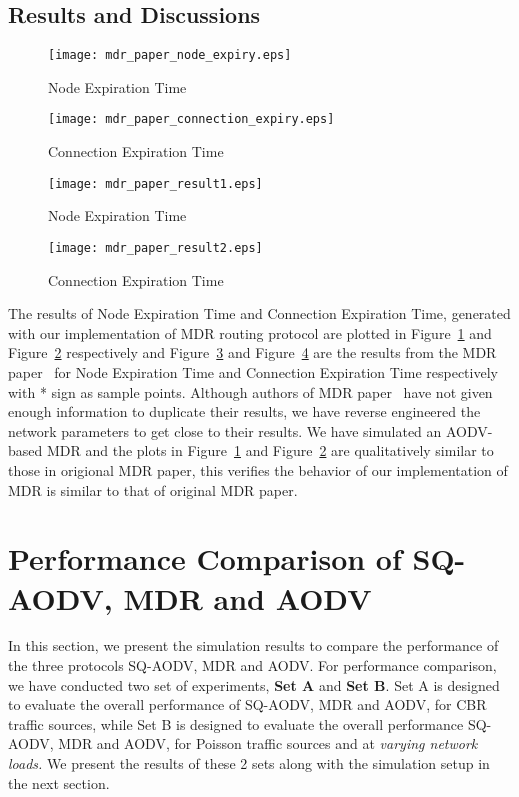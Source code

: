 \subsection{Results and Discussions}
\label{results-mdr}
\begin{figure}[htbp]
	\centering
	\texttt{[image: mdr\_paper\_node\_expiry.eps]}
	\caption{Node Expiration Time}
	\label{fig58}
\end{figure}

\begin{figure}[htbp]
	\centering
	\texttt{[image: mdr\_paper\_connection\_expiry.eps]}
	\caption{Connection Expiration Time}
	\label{fig59}
\end{figure}

\begin{figure}[htbp]
	\centering
	\texttt{[image: mdr\_paper\_result1.eps]}
	\caption{Node Expiration Time~\cite{mdr}}
	\label{fig510}
\end{figure}

\begin{figure}[htbp]
	\centering
	\texttt{[image: mdr\_paper\_result2.eps]}
	\caption{Connection Expiration Time~\cite{mdr}}
	\label{fig511}
\end{figure}

The results of Node Expiration Time and Connection Expiration Time, generated with our implementation of MDR routing protocol are plotted in Figure~\ref{fig58} and Figure~\ref{fig59} respectively and Figure~\ref{fig510} and Figure~\ref{fig511} are the results from the MDR paper~\cite{mdr} for Node Expiration Time and Connection Expiration Time respectively with * sign as sample points. Although authors of MDR paper~\cite{mdr} have not given enough information to duplicate their results, we have reverse engineered the network parameters to get close to their results. We have simulated an AODV-based MDR and the plots in Figure~\ref{fig58} and Figure~\ref{fig59} are qualitatively similar to those in origional MDR paper, this verifies the behavior of our implementation of MDR is similar to that of original MDR paper.

\section{Performance Comparison of SQ-AODV, MDR and AODV}
\label{comp-sq-aodv-mdr-and-aodv}
In this section, we present the simulation results to compare the performance of the three protocols SQ-AODV, MDR and AODV. For performance comparison, we have conducted two set of experiments, \textbf{Set A} and \textbf{Set B}. Set A is designed to evaluate the overall performance of SQ-AODV, MDR and AODV, for CBR traffic sources, while Set B is designed to evaluate the overall performance SQ-AODV, MDR and AODV, for Poisson traffic sources and at {\it varying network loads.} We present the results of these 2 sets along with the simulation setup in the next section.

